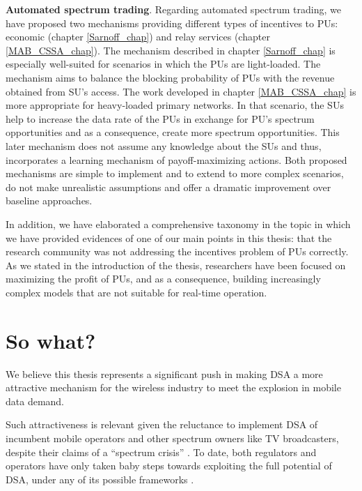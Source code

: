 \textbf{Automated spectrum trading}. Regarding automated spectrum trading, we have proposed two mechanisms providing different types of incentives to PUs: economic (chapter \ref{Sarnoff_chap}) and relay services (chapter \ref{MAB_CSSA_chap}). The mechanism described in chapter \ref{Sarnoff_chap} is especially well-suited for scenarios in which the PUs are light-loaded. The mechanism aims to balance the blocking probability of PUs with the revenue obtained from SU's access. The work developed in chapter \ref{MAB_CSSA_chap} is more appropriate for heavy-loaded primary networks. In that scenario, the SUs help to increase the data rate of the PUs in exchange for PU's spectrum opportunities and as a consequence, create more spectrum opportunities. This later mechanism does not assume any knowledge about the SUs and thus, incorporates a learning mechanism of payoff-maximizing actions. Both proposed mechanisms are simple to implement and to extend to more complex scenarios, do not make unrealistic assumptions and offer a dramatic improvement over baseline approaches. %

In addition, we have elaborated a comprehensive taxonomy in the topic in which we have provided evidences of one of our main points in this thesis: that the research community was not addressing the incentives problem of PUs correctly. As we stated in the introduction of the thesis, researchers have been focused on maximizing the profit of PUs, and as a consequence, building increasingly complex models that are not suitable for real-time operation.

\section{So what?} %
We believe this thesis represents a significant push in making DSA a more attractive mechanism for the wireless industry to meet the explosion in mobile data demand. 

Such attractiveness is relevant given the reluctance to implement DSA of incumbent mobile operators and other spectrum owners like TV broadcasters, despite their claims of a \enquote{spectrum crisis} \cite{Chen2012b}. To date, both regulators and operators have only taken baby steps towards exploiting the full potential of DSA, under any of its possible frameworks \cite{Nuechterlein2013, Kelly2012}.

